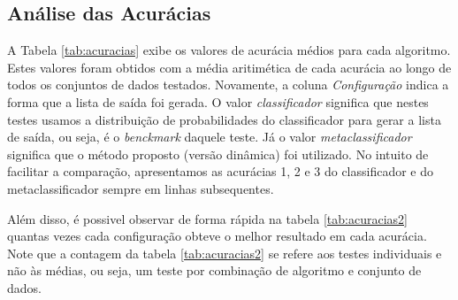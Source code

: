 \subsection{Análise das Acurácias}

A Tabela \ref{tab:acuracias} exibe os valores de acurácia médios para cada algoritmo. 
Estes valores foram obtidos com a média aritimética de cada acurácia ao longo de todos os conjuntos de dados testados.
Novamente, a coluna \textit{Configuração} indica a forma que a lista de saída foi gerada. 
O valor \textit{classificador} significa que nestes testes usamos a distribuição de probabilidades do classificador para gerar a lista de saída, ou seja, é o \textit{benckmark} daquele teste.
Já o valor \textit{metaclassificador} significa que o método proposto (versão dinâmica) foi utilizado.
No intuito de facilitar a comparação, apresentamos as acurácias 1, 2 e 3 do classificador e do metaclassificador sempre em linhas subsequentes.

Além disso, é possivel observar de forma rápida na tabela \ref{tab:acuracias2} quantas vezes cada configuração obteve o melhor resultado em cada acurácia.
Note que a contagem da tabela \ref{tab:acuracias2} se refere aos testes individuais e não às médias, ou seja, um teste por combinação de algoritmo e conjunto de dados.


